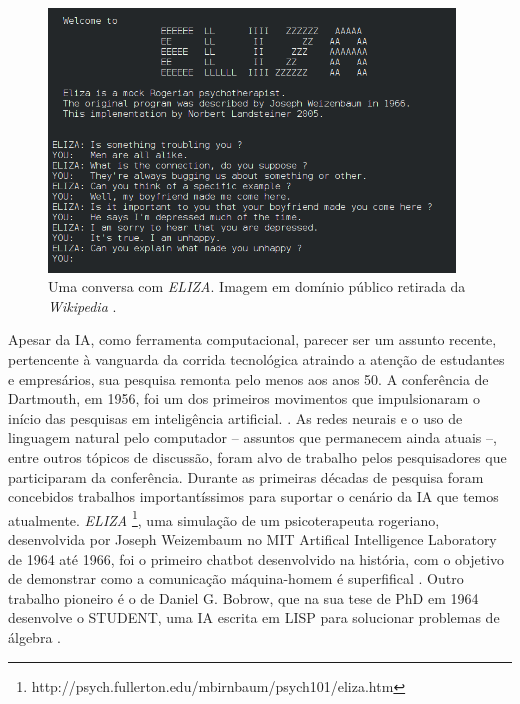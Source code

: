 \documentclass[12pt, a4paper]{article}
\begin{document}
\begin{figure}[ht!]
	\centering
	\includegraphics[width=\textwidth, height=7cm, keepaspectratio=true]{fig/eliza}
	\caption{
		Uma conversa com \emph{ELIZA}. Imagem em domínio público retirada da \emph{Wikipedia}
		\cite{wikipedia_eliza}.
	}
\end{figure}

Apesar da IA, como ferramenta computacional, parecer ser um assunto recente, 
pertencente à vanguarda da corrida tecnológica atraindo a atenção de estudantes e empresários, sua pesquisa
remonta pelo menos aos anos 50.
A conferência de Dartmouth, em 1956, foi um dos primeiros movimentos que impulsionaram o início das 
pesquisas em inteligência artificial. \cite{dartmouth}.
As redes neurais e o uso de linguagem natural pelo computador -- assuntos que permanecem ainda atuais --, entre outros tópicos de discussão,
foram alvo de trabalho pelos pesquisadores que participaram da conferência. 
Durante as primeiras décadas de pesquisa foram concebidos trabalhos importantíssimos para suportar o cenário da IA que temos atualmente.
\emph{ELIZA} \footnote{http://psych.fullerton.edu/mbirnbaum/psych101/eliza.htm}, 
uma simulação de um psicoterapeuta rogeriano, desenvolvida por Joseph Weizembaum no MIT Artifical Intelligence Laboratory de 1964 até 1966,
foi o primeiro chatbot desenvolvido na história, com o objetivo de demonstrar como a comunicação máquina-homem é superfifical \cite{wiezembaum}.
Outro trabalho pioneiro é o de Daniel G. Bobrow, que na sua tese de PhD em 1964 desenvolve o STUDENT, uma IA escrita em LISP para solucionar problemas
de álgebra \cite{student}.
\end{document}
